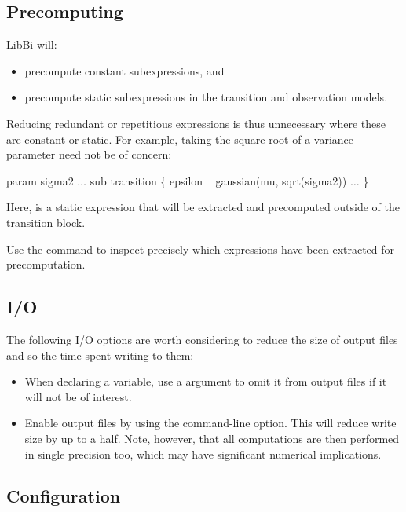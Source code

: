 \subsection{Precomputing}

LibBi will:
\begin{itemize}
\item precompute constant subexpressions, and
\item precompute static subexpressions in the transition and observation
  models.
\end{itemize}
Reducing redundant or repetitious expressions is thus unnecessary where these
are constant or
static. For example, taking the square-root of a
variance parameter need not be of concern:
\begin{bicode}
param sigma2
\(\ldots\)
sub transition \{
  epsilon ~ gaussian(mu, sqrt(sigma2))
  \(\ldots\)
\}
\end{bicode}
Here,  is a static expression
that will be extracted and precomputed outside of the transition block.

\begin{tip}
Use the  command to inspect precisely which expressions
have been extracted for precomputation.
\end{tip}

\subsection{I/O}

The following I/O options are worth considering to reduce the size of output
files and so the time spent writing to them:
\begin{itemize}
\item When declaring a variable, use a  argument to omit
  it from output files if it will not be of interest.
\item Enable  output files by using the
   command-line option. This will reduce write size by
  up to a half. Note, however, that all computations are then performed in
  single precision too, which may have significant numerical implications.
\end{itemize}

\subsection{Configuration}

